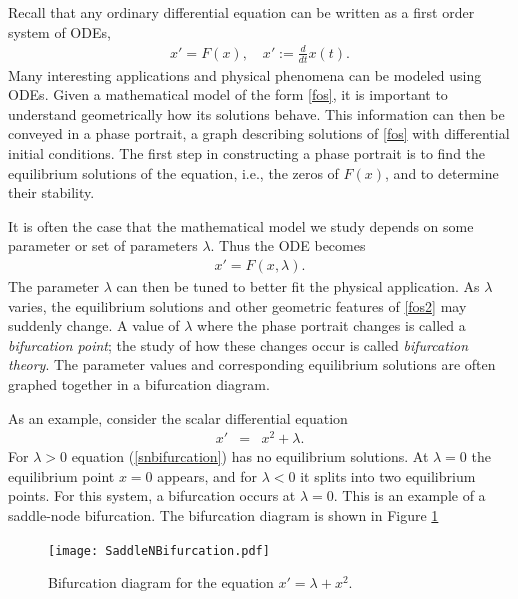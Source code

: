 \label{lab:Bifurcations}

Recall that any ordinary differential equation can be written as a first order system of ODEs,
\begin{align}
x' = F(x), \quad x' := \frac{d}{dt}x(t).\label{fos}
\end{align}
Many interesting applications and physical phenomena can be modeled using ODEs.
Given a mathematical model of the form \eqref{fos}, it is important to understand geometrically how its solutions behave.
This information can then be conveyed in a phase portrait, a graph describing solutions of \eqref{fos} with differential initial conditions.
The first step in constructing a phase portrait is to find the equilibrium solutions of the equation, i.e., the zeros of $F(x)$, and to determine their stability.

It is often the case that the mathematical model we study depends on some parameter or set of parameters $\lambda$.
Thus the ODE becomes
\begin{align}
x' = F(x,\lambda).\label{fos2}
\end{align}
The parameter $\lambda$ can then be tuned to better fit the physical application.
As $\lambda$ varies, the equilibrium solutions and other geometric features of \eqref{fos2} may suddenly change.
A value of $\lambda$ where the phase portrait changes is called a \emph{bifurcation point}; the study of how these changes occur is called \emph{bifurcation theory}.
The parameter values and corresponding equilibrium solutions are often graphed together in a bifurcation diagram.

As an example, consider the scalar differential equation
\begin{eqnarray}
x' &=& x^2 + \lambda. \label{snbifurcation}
\end{eqnarray}
For $\lambda > 0$ equation (\ref{snbifurcation}) has no equilibrium solutions.
At $\lambda = 0$ the equilibrium point $x=0$ appears, and for $\lambda < 0$ it splits into two equilibrium points.
For this system, a bifurcation occurs at $\lambda = 0$.
This is an example of a saddle-node bifurcation.
The bifurcation diagram is shown in Figure \ref{bifurcation:sn}

\newpage
\begin{figure}
\centering
\texttt{[image: SaddleNBifurcation.pdf]}
\caption{Bifurcation diagram for the equation $x' = \lambda + x^2$.}
\label{bifurcation:sn}
\end{figure}

